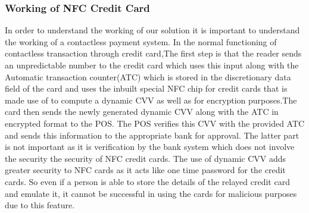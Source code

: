 \documentclass[conference]{IEEEtran}
\begin{document}
\subsubsection{Working of NFC Credit Card}
In order to understand the working of our solution it is important to understand the working of a contactless payment system. In the normal functioning of contactless transaction through credit card,The first step is that the reader sends an unpredictable number to the credit card which uses this input along with the Automatic transaction counter(ATC) which is stored in the discretionary data field of the card and uses the inbuilt special NFC chip for credit cards that is made use of to compute a dynamic CVV as well as for encryption purposes.The card then sends the newly generated dynamic CVV along with the ATC in encrypted format to the POS. The POS verifies this CVV with the provided ATC and sends this information to the appropriate bank for approval. The latter part is not important as it is verification by the bank system which  does not involve the security the security of NFC credit cards. The use of dynamic CVV adds greater security to NFC cards as it acts like one time password for the credit cards. So even if a person is able to store the details of the relayed credit card and emulate it, it cannot be successful in using the cards for malicious purposes due to this feature.
\end{document}
